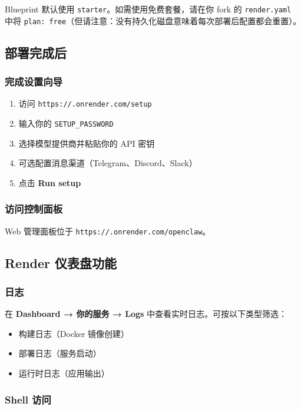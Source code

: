 Blueprint 默认使用 \texttt{starter}。如需使用免费套餐，请在你 fork 的 \texttt{render.yaml} 中将 \texttt{plan: free}（但请注意：没有持久化磁盘意味着每次部署后配置都会重置）。

\subsection{部署完成后}


\subsubsection{完成设置向导}


\begin{enumerate}
  \item 访问 \texttt{https://.onrender.com/setup}
  \item 输入你的 \texttt{SETUP\_PASSWORD}
  \item 选择模型提供商并粘贴你的 API 密钥
  \item 可选配置消息渠道（Telegram、Discord、Slack）
  \item 点击 \textbf{Run setup}
\end{enumerate}


\subsubsection{访问控制面板}


Web 管理面板位于 \texttt{https://.onrender.com/openclaw}。

\subsection{Render 仪表盘功能}


\subsubsection{日志}


在 \textbf{Dashboard → 你的服务 → Logs} 中查看实时日志。可按以下类型筛选：

\begin{itemize}
  \item 构建日志（Docker 镜像创建）
  \item 部署日志（服务启动）
  \item 运行时日志（应用输出）
\end{itemize}


\subsubsection{Shell 访问}


